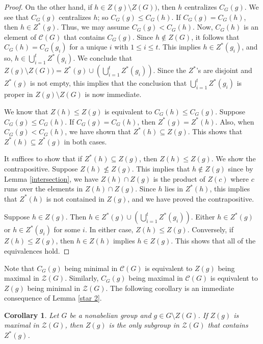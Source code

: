 \documentclass[12pt]{amsart}
\newtheorem{corollary}[theorem]{Corollary}
\begin{document}
{\begin{proof}
On the other hand, if $h \in Z(g) \setminus Z(G))$, then $h$ centralizes $C_G (g)$.  We see that $C_G (g)$ centralizes $h$; so $C_G (g) \le C_G (h)$.  If $C_G (g) = C_G (h)$, then $h \in Z^* (g)$.  Thus, we may assume $C_G (g) < C_G (h)$.  Now, $C_G (h)$ is an element of ${\mathcal C} (G)$ that contains $C_G (g)$.   Since $h \not\in Z(G)$, it follows that $C_G (h) = C_G (g_i)$ for a unique $i$ with $1 \le i \le t$.  This implies $h \in Z^* (g_i)$, and so, $\displaystyle h \in \bigcup_{i=1}^t Z^* (g_i)$.  We conclude that $\displaystyle Z(g) \setminus Z(G)) = Z^* (g) \cup (\bigcup_{i=1}^t Z^* (g_i))$.   Since the $Z^*$'s are disjoint and $Z^* (g)$ is not empty, this implies that  the conclusion that $\displaystyle \bigcup_{i=1}^t Z^* (g_i)$ is proper in $Z(g) \setminus Z(G)$ is now immediate. 
	
We know that $Z(h) \le Z(g)$ is equivalent to $C_G (h) \le C_G (g)$.  Suppose $C_G (g) \le C_G (h)$.  If $C_G (g) = C_G (h)$, then $Z^* (g) = Z^* (h)$.  Also, when $C_G (g) < C_G (h)$, we have shown that $Z^* (h) \subseteq Z (g)$.  This shows that $Z^* (h) \subseteq Z^* (g)$ in both cases.
	
It suffices to show that if $Z^* (h) \subseteq Z (g)$, then $Z(h) \le Z(g)$.  We show the contrapositive.  Suppose $Z (h) \not\le Z (g)$.  This implies that $h \not\in Z(g)$ since by Lemma \ref{intersection}, we have $Z(h) \cap Z(g)$ is the product of $Z (c)$ where $c$ runs over the elements in $Z(h) \cap Z(g)$.  Since $h$ lies in $Z^* (h)$, this implies that $Z^* (h)$ is not contained in $Z(g)$, and we have proved the contrapositive.
	
Suppose $h \in Z(g)$.  Then $\displaystyle h \in Z^* (g) \cup (\bigcup_{i=1}^t Z^* (g_i))$.  Either $h \in Z^* (g)$ or $h \in Z^* (g_i)$ for some $i$.  In either case, $Z (h) \le Z(g)$.  Conversely, if $Z(h) \le Z(g)$, then $h \in Z(h)$ implies $h \in Z(g)$.  This shows that all of the equivalences hold.
\end{proof}

Note that $C_G (g)$ being minimal in ${\mathcal C} (G)$ is equivalent to $Z (g)$ being maximal in ${\mathcal Z} (G)$.  Similarly, $C_G (g)$ being maximal in ${\mathcal C} (G)$ is equivalent to $Z (g)$ being minimal in ${\mathcal Z} (G)$.  The following corollary is an immediate consequence of Lemma \ref{star 2}.

\begin{corollary} \label{maximal Z}
Let $G$ be a nonabelian group and $g \in G \setminus Z(G)$.  If $Z(g)$ is maximal in ${\mathcal {Z} (G)}$, then $Z(g)$ is the only subgroup in ${\mathcal {Z} (G)}$ that contains $Z^* (g)$.
\end{corollary}

}
\end{document}
